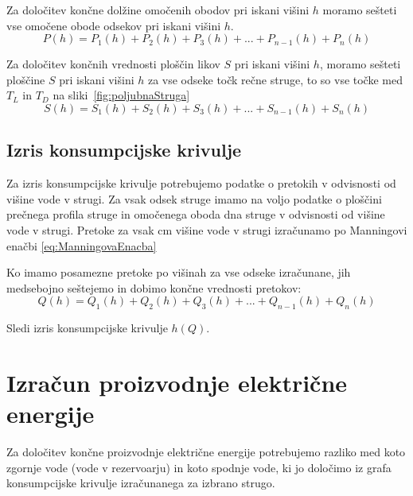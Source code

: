 Za določitev končne dolžine omočenih obodov pri iskani višini $h$ moramo sešteti vse omočene obode odsekov pri iskani višini $h$.
\begin{equation}
P(h) = P_1(h) + P_2(h) + P_3(h) + ... + P_{n-1}(h) + P_n(h)
\end{equation}


Za določitev končnih vrednosti ploščin likov $S$ pri iskani višini $h$, moramo sešteti ploščine $S$ pri iskani višini $h$ za vse odseke točk rečne struge, to so vse točke med $T_L$ in $T_D$ na sliki~\ref{fig:poljubnaStruga}
\begin{equation}
S(h) = S_1(h) + S_2(h) + S_3(h) + ... + S_{n-1}(h) + S_n(h)
\end{equation}





\subsection{Izris konsumpcijske krivulje}

Za izris konsumpcijske krivulje potrebujemo podatke o pretokih v odvisnosti od višine vode v strugi. Za vsak odsek struge imamo na voljo podatke o ploščini prečnega profila struge in omočenega oboda dna struge v odvisnosti od višine vode v strugi. Pretoke za vsak cm višine vode v strugi izračunamo po Manningovi enačbi \ref{eq:ManningovaEnacba}


Ko imamo posamezne pretoke po višinah za vse odseke izračunane, jih medsebojno seštejemo in dobimo končne vrednosti pretokov:
\begin{equation}
Q(h) = Q_1(h) + Q_2(h) + Q_3(h) + ... + Q_{n-1}(h) + Q_n(h)
\end{equation}

Sledi izris konsumpcijske krivulje $h(Q)$.




\newpage



\section{Izračun proizvodnje električne energije}
Za določitev končne proizvodnje električne energije potrebujemo razliko med koto zgornje vode (vode v rezervoarju) in koto spodnje vode, ki jo določimo iz grafa konsumpcijske krivulje izračunanega za izbrano strugo.

